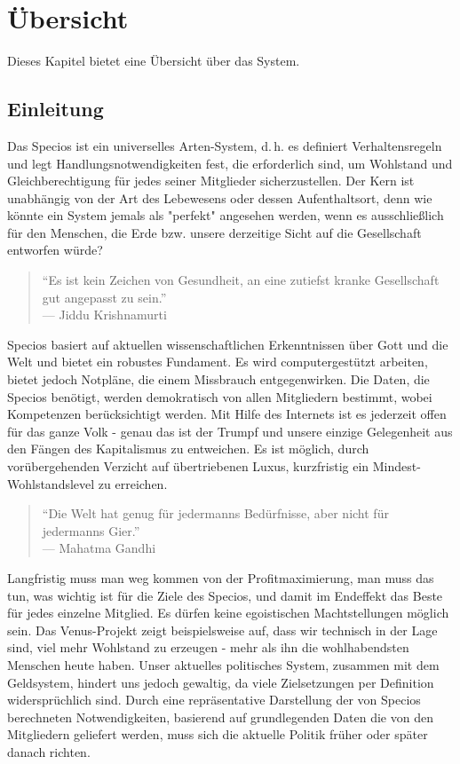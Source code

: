 \chapter{Übersicht}\label{chap:overview}

Dieses Kapitel bietet eine Übersicht über das System.

\section{Einleitung}

Das Specios ist ein universelles Arten-System, d.\,h. es definiert Verhaltensregeln und legt Handlungsnotwendigkeiten fest, die erforderlich sind, um Wohlstand und Gleichberechtigung für jedes seiner Mitglieder sicherzustellen. Der Kern ist unabhängig von der Art des Lebewesens oder dessen Aufenthaltsort, denn wie könnte ein System jemals als "perfekt" angesehen werden, wenn es ausschließlich für den Menschen, die Erde bzw. unsere derzeitige Sicht auf die Gesellschaft entworfen würde?

\begin{quote}
"`Es ist kein Zeichen von Gesundheit, an eine zutiefst kranke Gesellschaft gut angepasst zu sein."'\\
--- Jiddu Krishnamurti
\end{quote}

Specios basiert auf aktuellen wissenschaftlichen Erkenntnissen über Gott und die Welt und bietet ein robustes Fundament. Es wird computergestützt arbeiten, bietet jedoch Notpläne, die einem Missbrauch entgegenwirken. Die Daten, die Specios benötigt, werden demokratisch von allen Mitgliedern bestimmt, wobei Kompetenzen berücksichtigt werden. Mit Hilfe des Internets ist es jederzeit offen für das ganze Volk - genau das ist der Trumpf und unsere einzige Gelegenheit aus den Fängen des Kapitalismus zu entweichen. Es ist möglich, durch vorübergehenden Verzicht auf übertriebenen Luxus, kurzfristig ein Mindest-Wohlstandslevel zu erreichen.

\begin{quote}
"`Die Welt hat genug für jedermanns Bedürfnisse, aber nicht für jedermanns Gier."'\\
--- Mahatma Gandhi
\end{quote}

Langfristig muss man weg kommen von der Profitmaximierung, man muss das tun, was wichtig ist für die Ziele des Specios, und damit im Endeffekt das Beste für jedes einzelne Mitglied. Es dürfen keine egoistischen Machtstellungen möglich sein. Das Venus-Projekt zeigt beispielsweise auf, dass wir technisch in der Lage sind, viel mehr Wohlstand zu erzeugen - mehr als ihn die wohlhabendsten Menschen heute haben. Unser aktuelles politisches System, zusammen mit dem Geldsystem, hindert uns jedoch gewaltig, da viele Zielsetzungen per Definition widersprüchlich sind. Durch eine repräsentative Darstellung der von Specios berechneten Notwendigkeiten, basierend auf grundlegenden Daten die von den Mitgliedern geliefert werden, muss sich die aktuelle Politik früher oder später danach richten.

